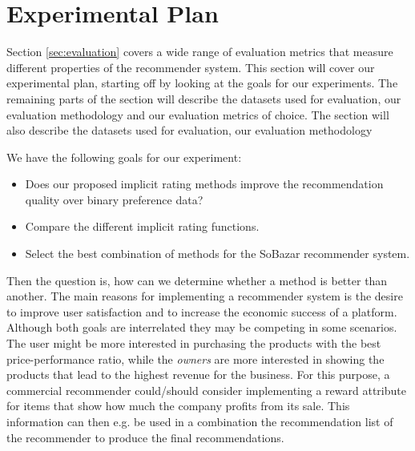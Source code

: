 
\section{Experimental Plan}


Section \ref{sec:evaluation} covers a wide range of evaluation metrics that
measure different properties of the recommender system. This section will cover
our experimental plan, starting off by looking at the goals for our experiments.
The remaining parts of the section will describe the datasets used for evaluation,
our evaluation methodology and our evaluation metrics of choice.
The section will also describe the datasets used for evaluation, our evaluation methodology

We have the following goals for our experiment:

\begin{itemize}
	\item Does our proposed implicit rating methods improve the recommendation quality over
	binary preference data?
	\item Compare the different implicit rating functions.
	\item Select the best combination of methods for the SoBazar recommender system.
\end{itemize}


Then the question is, how can we determine whether a method is better than another. The
main reasons for implementing a recommender system is the desire to improve user
satisfaction and to increase the economic success of a platform. Although both goals
are interrelated they may be competing in some scenarios. The user might be more interested
in purchasing the products with the best price-performance ratio, while the \emph{owners}
are more interested in showing the products that lead to the highest revenue for the
business. For this purpose, a commercial recommender could/should consider implementing
a reward attribute for items that show how much the company profits from its sale. This
information can then e.g. be used in a combination the recommendation list of the recommender
to produce the final recommendations.

